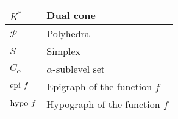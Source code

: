 \begin{xltabular}{\textwidth}{XX}
	\(K^*\)                                                                                                                  & Dual cone                                                                                                                                                                                                      \\ \hline
	\(\mathcal{P}\)                                                                                                          & Polyhedra                                                                                                                                                                                                      \\ \hline
	\(S\)                                                                                                                    & Simplex                                                                                                                                                                                                        \\ \hline
	\(C_\alpha\)                                                                                                             & \(\alpha\)-sublevel set                                                                                                                                                                                        \\ \hline
	\(\textnormal{epi } f\)                                                                                                  & Epigraph of the function \(f\)                                                                                                                                                                                 \\ \hline
	\(\textnormal{hypo } f\)                                                                                                 & Hypograph of the function \(f\)
\end{xltabular}

